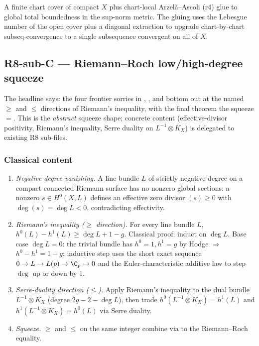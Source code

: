 \begin{lemma}
\label{lem:r8subB-C-r5}
A finite chart cover of compact \(X\) plus chart-local Arzel\`a--Ascoli
(r4) glue to global total boundedness in the sup-norm metric.
The gluing uses the Lebesgue number of the open cover plus a
diagonal extraction to upgrade chart-by-chart subseq-convergence
to a single subsequence convergent on all of \(X\).
\leanok
\end{lemma}

\subsection{R8-sub-C --- Riemann--Roch low/high-degree squeeze}
\label{subsec:gap-R8subC-rr-squeeze}

The headline says: the four frontier sorries in
,
, and
 bottom out at the named
\(\geq\) and \(\leq\) directions of Riemann's inequality, with the
final theorem the squeeze \(=\).  This is the \emph{abstract} squeeze
shape; concrete content (effective-divisor positivity, Riemann's
inequality, Serre duality on \(L^{-1}\otimes K_{X}\)) is delegated to
existing R8 sub-files.

\subsubsection*{Classical content}

\begin{enumerate}
\item \emph{Negative-degree vanishing.}  A line bundle \(L\) of
  strictly negative degree on a compact connected Riemann surface
  has no nonzero global sections: a nonzero \(s\in H^{0}(X,L)\)
  defines an effective zero divisor \((s)\geq 0\) with
  \(\deg(s)=\deg L<0\), contradicting effectivity.
\item \emph{Riemann's inequality (\(\geq\) direction).}  For every
  line bundle \(L\), \(h^{0}(L)-h^{1}(L)\geq\deg L+1-g\).
  Classical proof: induct on \(\deg L\).  Base case
  \(\deg L=0\): the trivial bundle has \(h^{0}=1,h^{1}=g\) by
  Hodge \(\Rightarrow\) \(h^{0}-h^{1}=1-g\); inductive step uses
  the short exact sequence
  \(0\to L\to L(p)\to\C_{p}\to 0\) and the Euler-characteristic
  additive law to step \(\deg\) up or down by 1.
\item \emph{Serre-duality direction (\(\leq\)).}  Apply Riemann's
  inequality to the dual bundle \(L^{-1}\otimes K_{X}\) (degree
  \(2g-2-\deg L\)), then trade \(h^{0}(L^{-1}\otimes K_{X})=h^{1}(L)\)
  and \(h^{1}(L^{-1}\otimes K_{X})=h^{0}(L)\) via Serre duality.
\item \emph{Squeeze.}  \(\geq\) and \(\leq\) on the same integer
  combine via  to the Riemann--Roch equality.
\end{enumerate}

